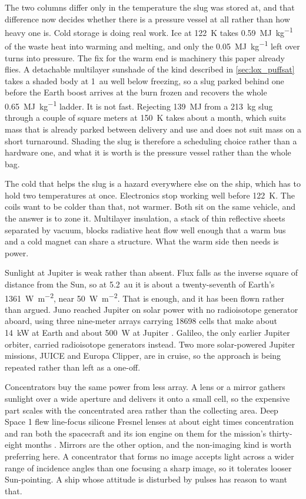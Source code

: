 \documentclass{article}
\begin{document}
The two columns differ only in the temperature the slug was stored at, and that difference now decides whether there is a pressure vessel at all rather than how heavy one is. Cold storage is doing real work. Ice at \SI{122}{\kelvin} takes \SI{0.59}{\mega\joule\per\kilogram} of the waste heat into warming and melting, and only the \SI{0.05}{\mega\joule\per\kilogram} left over turns into pressure. The fix for the warm end is machinery this paper already flies. A detachable multilayer sunshade of the kind described in \autoref{sec:lox_puffsat} takes a shaded body at \SI{1}{\astronomicalunit} well below freezing, so a slug parked behind one before the Earth boost arrives at the burn frozen and recovers the whole \SI{0.65}{\mega\joule\per\kilogram} ladder. It is not fast. Rejecting \SI{139}{\mega\joule} from a \SI{213}{\kilogram} slug through a couple of square meters at \SI{150}{\kelvin} takes about a month, which suits mass that is already parked between delivery and use and does not suit mass on a short turnaround. Shading the slug is therefore a scheduling choice rather than a hardware one, and what it is worth is the pressure vessel rather than the whole bag.

The cold that helps the slug is a hazard everywhere else on the ship, which has to hold two temperatures at once. Electronics stop working well before \SI{122}{\kelvin}. The coils want to be colder than that, not warmer. Both sit on the same vehicle, and the answer is to zone it. Multilayer insulation, a stack of thin reflective sheets separated by vacuum, blocks radiative heat flow well enough that a warm bus and a cold magnet can share a structure. What the warm side then needs is power.

Sunlight at Jupiter is weak rather than absent. Flux falls as the inverse square of distance from the Sun, so at \SI{5.2}{\astronomicalunit} it is about a twenty-seventh of Earth's \SI{1361}{\watt\per\square\meter}, near \SI{50}{\watt\per\square\meter}. That is enough, and it has been flown rather than argued. Juno reached Jupiter on solar power with no radioisotope generator aboard, using three nine-meter arrays carrying \num{18698} cells that make about \SI{14}{\kilo\watt} at Earth and about \SI{500}{\watt} at Jupiter \cite{bolton2017juno, jpl_juno_solar_record}. Galileo, the only earlier Jupiter orbiter, carried radioisotope generators instead. Two more solar-powered Jupiter missions, JUICE and Europa Clipper, are in cruise, so the approach is being repeated rather than left as a one-off.

Concentrators buy the same power from less array. A lens or a mirror gathers sunlight over a wide aperture and delivers it onto a small cell, so the expensive part scales with the concentrated area rather than the collecting area. Deep Space 1 flew line-focus silicone Fresnel lenses at about eight times concentration and ran both the spacecraft and its ion engine on them for the mission's thirty-eight months \cite{stella2000scarlet}. Mirrors are the other option, and the non-imaging kind is worth preferring here. A concentrator that forms no image accepts light across a wider range of incidence angles than one focusing a sharp image, so it tolerates looser Sun-pointing. A ship whose attitude is disturbed by pulses has reason to want that.
\end{document}
